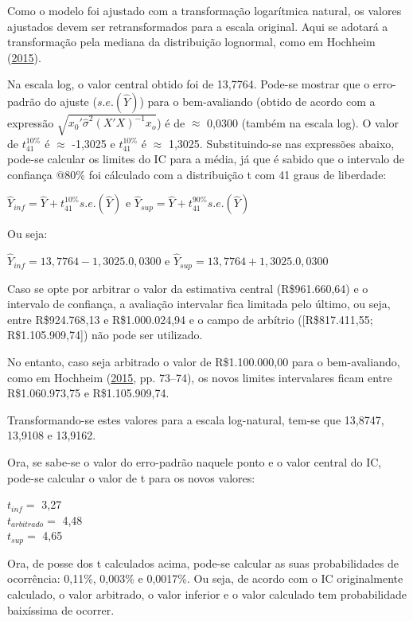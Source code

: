 \documentclass[a4paper, 12pt]{article}
\begin{document}
Como o modelo foi ajustado com a transformação logarítmica natural, os
valores ajustados devem ser retransformados para a escala original. Aqui
se adotará a transformação pela mediana da distribuição lognormal, como
em Hochheim (\protect\hyperlink{ref-hochheim}{2015}).

Na escala log, o valor central obtido foi de 13,7764. Pode-se mostrar
que o erro-padrão do ajuste (\(s.e.(\hat Y)\)) para o bem-avaliando
(obtido de acordo com a expressão
\(\sqrt{x_0'\hat\sigma^2(X'X)^{-1}x_o}\)) é de \(\approx\) 0,0300
(também na escala log). O valor de \(t_{41}^{10\%}\) é \(\approx\)
-1,3025 e \(t_{41}^{10\%}\) é \(\approx\) 1,3025. Substituindo-se nas
expressões abaixo, pode-se calcular os limites do IC para a média, já
que é sabido que o intervalo de confiança @80\% foi cálculado com a
distribuição t com 41 graus de liberdade:

\(\hat Y_{inf} = \hat Y + t_{41}^{10\%}s.e.(\hat Y)\) e
\(\hat Y_{sup} = \hat Y + t_{41}^{90\%}s.e.(\hat Y)\)

Ou seja:

\(\hat Y_{inf} = 13,7764 - 1,3025.0,0300\) e
\(\hat Y_{sup} = 13,7764 + 1,3025.0,0300\)

Caso se opte por arbitrar o valor da estimativa central (R\$961.660,64)
e o intervalo de confiança, a avaliação intervalar fica limitada pelo
último, ou seja, entre R\$924.768,13 e R\$1.000.024,94 e o campo de
arbítrio ({[}R\$817.411,55; R\$1.105.909,74{]}) não pode ser utilizado.

No entanto, caso seja arbitrado o valor de R\$1.100.000,00 para o
bem-avaliando, como em Hochheim (\protect\hyperlink{ref-hochheim}{2015},
pp. 73--74), os novos limites intervalares ficam entre R\$1.060.973,75 e
R\$1.105.909,74.

Transformando-se estes valores para a escala log-natural, tem-se que
13,8747, 13,9108 e 13,9162.

Ora, se sabe-se o valor do erro-padrão naquele ponto e o valor central
do IC, pode-se calcular o valor de t para os novos valores:

\(t_{inf} =\) 3,27\\
\(t_{arbitrado} =\) 4,48\\
\(t_{sup} =\) 4,65

Ora, de posse dos t calculados acima, pode-se calcular as suas
probabilidades de ocorrência: 0,11\%, 0,003\% e 0,0017\%. Ou seja, de
acordo com o IC originalmente calculado, o valor arbitrado, o valor
inferior e o valor calculado tem probabilidade baixíssima de ocorrer.
\end{document}
